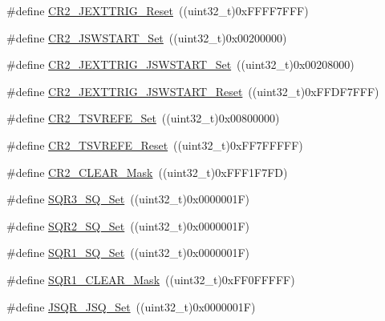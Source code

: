 \begin{DoxyCompactItemize}
\item 
\#define \hyperlink{group___a_d_c___private___defines_ga94404d5a0103c5e2d7ffa45956356931}{C\+R2\+\_\+\+J\+E\+X\+T\+T\+R\+I\+G\+\_\+\+Reset}~((uint32\+\_\+t)0x\+F\+F\+F\+F7\+F\+F\+F)
\item 
\#define \hyperlink{group___a_d_c___private___defines_ga5292617782f3327f2e1ed0bd9461704e}{C\+R2\+\_\+\+J\+S\+W\+S\+T\+A\+R\+T\+\_\+\+Set}~((uint32\+\_\+t)0x00200000)
\item 
\#define \hyperlink{group___a_d_c___private___defines_gaac5989ccf10d806f2f6a70f925d6b130}{C\+R2\+\_\+\+J\+E\+X\+T\+T\+R\+I\+G\+\_\+\+J\+S\+W\+S\+T\+A\+R\+T\+\_\+\+Set}~((uint32\+\_\+t)0x00208000)
\item 
\#define \hyperlink{group___a_d_c___private___defines_gaaa2fb01c1649fde61115602559942ee2}{C\+R2\+\_\+\+J\+E\+X\+T\+T\+R\+I\+G\+\_\+\+J\+S\+W\+S\+T\+A\+R\+T\+\_\+\+Reset}~((uint32\+\_\+t)0x\+F\+F\+D\+F7\+F\+F\+F)
\item 
\#define \hyperlink{group___a_d_c___private___defines_ga7f5e0f807edebbfcef4883f3ec42b9e8}{C\+R2\+\_\+\+T\+S\+V\+R\+E\+F\+E\+\_\+\+Set}~((uint32\+\_\+t)0x00800000)
\item 
\#define \hyperlink{group___a_d_c___private___defines_gaa207bc0eeed8b546dc9536b02df633b5}{C\+R2\+\_\+\+T\+S\+V\+R\+E\+F\+E\+\_\+\+Reset}~((uint32\+\_\+t)0x\+F\+F7\+F\+F\+F\+F\+F)
\item 
\#define \hyperlink{group___a_d_c___private___defines_ga49192361afb92aee0e3f1124ef1131a0}{C\+R2\+\_\+\+C\+L\+E\+A\+R\+\_\+\+Mask}~((uint32\+\_\+t)0x\+F\+F\+F1\+F7\+F\+D)
\item 
\#define \hyperlink{group___a_d_c___private___defines_ga8a04f115021dc5261562b4dc04c01109}{S\+Q\+R3\+\_\+\+S\+Q\+\_\+\+Set}~((uint32\+\_\+t)0x0000001\+F)
\item 
\#define \hyperlink{group___a_d_c___private___defines_ga2329f779aee00e5990d6430a01de8cb0}{S\+Q\+R2\+\_\+\+S\+Q\+\_\+\+Set}~((uint32\+\_\+t)0x0000001\+F)
\item 
\#define \hyperlink{group___a_d_c___private___defines_ga91fb5f63b765a543dfa419ea0219351b}{S\+Q\+R1\+\_\+\+S\+Q\+\_\+\+Set}~((uint32\+\_\+t)0x0000001\+F)
\item 
\#define \hyperlink{group___a_d_c___private___defines_ga6e3e238f38d7ff17939cbd5417fc51cc}{S\+Q\+R1\+\_\+\+C\+L\+E\+A\+R\+\_\+\+Mask}~((uint32\+\_\+t)0x\+F\+F0\+F\+F\+F\+F\+F)
\item 
\#define \hyperlink{group___a_d_c___private___defines_ga5d460390dbe3b400b5e0fdf1e94929f0}{J\+S\+Q\+R\+\_\+\+J\+S\+Q\+\_\+\+Set}~((uint32\+\_\+t)0x0000001\+F)

\end{DoxyCompactItemize}
